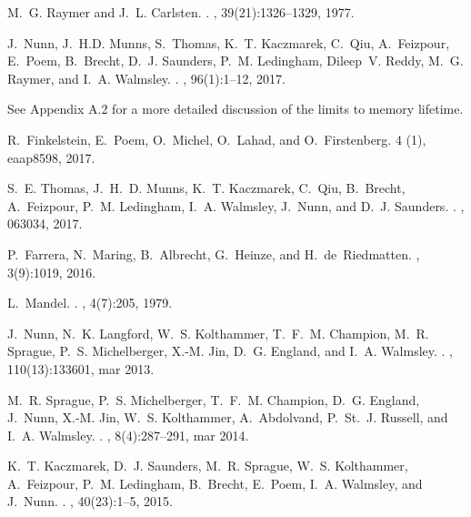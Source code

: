 \documentclass[%
 reprint,
 amsmath,amssymb,
 aps,
 pra,
]{revtex4-1}
\begin{document}
\begin{thebibliography}{10}
M.~G. Raymer and J.~L. Carlsten.
.
, 39(21):1326--1329, 1977.

J.~Nunn, J.~H.D. Munns, S.~Thomas, K.~T. Kaczmarek, C.~Qiu, A.~Feizpour,
  E.~Poem, B.~Brecht, D.~J. Saunders, P.~M. Ledingham, Dileep~V. Reddy, M.~G.
  Raymer, and I.~A. Walmsley.
.
, 96(1):1--12, 2017.

See Appendix A.2 for a more detailed discussion of the limits to memory lifetime.

R.~Finkelstein, E.~Poem, O.~Michel, O.~Lahad, and O.~Firstenberg.
   4 (1), eaap8598, 2017.

S.~E. Thomas, J.~H.~D. Munns, K.~T. Kaczmarek, C.~Qiu, B.~Brecht, A.~Feizpour,
  P.~M. Ledingham, I.~A. Walmsley, J.~Nunn, and D.~J. Saunders.
.
, 063034, 2017.

P.~Farrera, N.~Maring, B.~Albrecht, G.~Heinze, and H.~de~Riedmatten.
, 3(9):1019, 2016.

L.~Mandel.
.
, 4(7):205, 1979.

J.~Nunn, N.~K. Langford, W.~S. Kolthammer, T.~F.~M. Champion, M.~R. Sprague,
  P.~S. Michelberger, X.-M. Jin, D.~G. England, and I.~A. Walmsley.
.
, 110(13):133601, mar 2013.

M.~R. Sprague, P.~S. Michelberger, T.~F.~M. Champion, D.~G. England, J.~Nunn,
  X.-M. Jin, W.~S. Kolthammer, A.~Abdolvand, P.~St.~J. Russell, and I.~A.
  Walmsley.
.
, 8(4):287--291, mar 2014.

K.~T. Kaczmarek, D.~J. Saunders, M.~R. Sprague, W.~S. Kolthammer, A.~Feizpour,
  P.~M. Ledingham, B.~Brecht, E.~Poem, I.~A. Walmsley, and J.~Nunn.
.
, 40(23):1--5, 2015.


\end{thebibliography}
\end{document}
